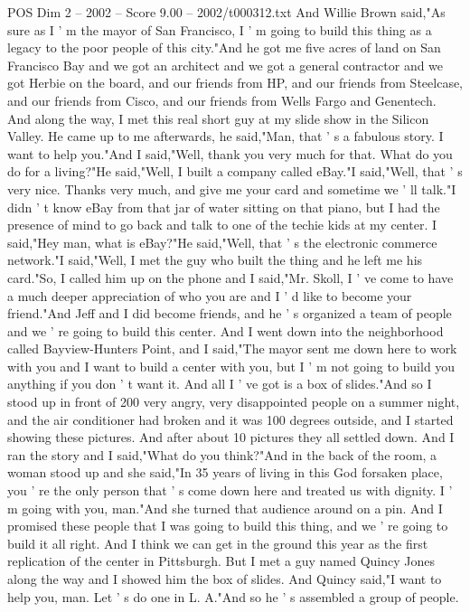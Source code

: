 \begin{textsample}{POS Dim 2 – 2002 – Score 9.00 – 2002/t000312.txt}
And Willie Brown said,"As sure as I ' m the mayor of San Francisco, I ' m going to build this thing as a legacy to the poor people of this city."And he got me five acres of land on San Francisco Bay and we got an architect and we got a general contractor and we got Herbie on the board, and our friends from HP, and our friends from Steelcase, and our friends from Cisco, and our friends from Wells Fargo and Genentech.
And along the way, I met this real short guy at my slide show in the Silicon Valley.
He came up to me afterwards, he said,"Man, that ' s a fabulous story.
I want to help you."And I said,"Well, thank you very much for that.
What do you do for a living?"He said,"Well, I built a company called eBay."I said,"Well, that ' s very nice.
Thanks very much, and give me your card and sometime we ' ll talk."I didn ' t know eBay from that jar of water sitting on that piano, but I had the presence of mind to go back and talk to one of the techie kids at my center.
I said,"Hey man, what is eBay?"He said,"Well, that ' s the electronic commerce network."I said,"Well, I met the guy who built the thing and he left me his card."So, I called him up on the phone and I said,"Mr.
Skoll, I ' ve come to have a much deeper appreciation of who you are and I ' d like to become your friend."And Jeff and I did become friends, and he ' s organized a team of people and we ' re going to build this center.
And I went down into the neighborhood called Bayview-Hunters Point, and I said,"The mayor sent me down here to work with you and I want to build a center with you, but I ' m not going to build you anything if you don ' t want it.
And all I ' ve got is a box of slides."And so I stood up in front of 200 very angry, very disappointed people on a summer night, and the air conditioner had broken and it was 100 degrees outside, and I started showing these pictures.
And after about 10 pictures they all settled down.
And I ran the story and I said,"What do you think?"And in the back of the room, a woman stood up and she said,"In 35 years of living in this God forsaken place, you ' re the only person that ' s come down here and treated us with dignity.
I ' m going with you, man."And she turned that audience around on a pin.
And I promised these people that I was going to build this thing, and we ' re going to build it all right.
And I think we can get in the ground this year as the first replication of the center in Pittsburgh.
But I met a guy named Quincy Jones along the way and I showed him the box of slides.
And Quincy said,"I want to help you, man.
Let ' s do one in L.
A."And so he ' s assembled a group of people.

\end{textsample}
